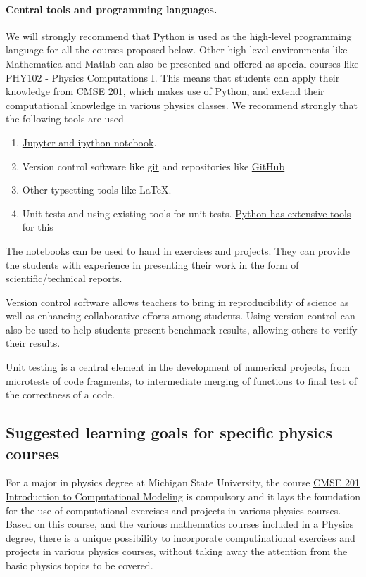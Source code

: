 \documentclass[%
oneside,                 %
final,                   %
10pt]{article}
\begin{document}
\paragraph{Central tools and programming languages.}
We will strongly recommend that Python is used as the high-level programming language for all the courses proposed below. Other high-level environments like Mathematica and Matlab can also be presented and offered as special courses like PHY102 - Physics Computations I. This means that students can apply their knowledge from CMSE 201, which makes use of Python, and extend their computational knowledge in various physics classes. We recommend strongly that the following tools are used
\begin{enumerate}
\item \href{{http://jupyter.org/}}{Jupyter and ipython notebook}.

\item Version control software like \href{{https://git-scm.com/}}{git} and repositories like \href{{https://github.com/}}{GitHub}

\item Other typsetting tools like {\LaTeX}.

\item Unit tests and using existing tools for unit tests. \href{{https://docs.python.org/2/library/unittest.html}}{Python has extensive tools for this}
\end{enumerate}

\noindent
The notebooks can be used to hand in exercises and projects. They can provide the students with experience in presenting their work in the form of scientific/technical reports.

Version control software allows teachers to bring in reproducibility of science as well as enhancing
collaborative efforts among students. Using version control can also be used to help students present benchmark results, allowing others to verify their results.

Unit testing is a central element in the development of numerical projects, from microtests of code fragments, to intermediate merging of functions to final test of the correctness of a code.

\subsection*{Suggested learning goals for specific physics courses}

For a major in physics degree at Michigan State University, the course \href{{https://cmse.msu.edu/academics/undergraduate-program/undergraduate-courses/cmse-201-introduction-to-computational-modeling/}}{CMSE 201 Introduction to Computational Modeling} is compulsory and it lays the foundation for the use of computational exercises and projects in various physics courses. Based on this course, and the various mathematics courses included in a Physics degree, there is a unique possibility to incorporate computinational exercises and projects in various physics courses, without taking away the attention from the basic physics topics to be covered. 
\end{document}
